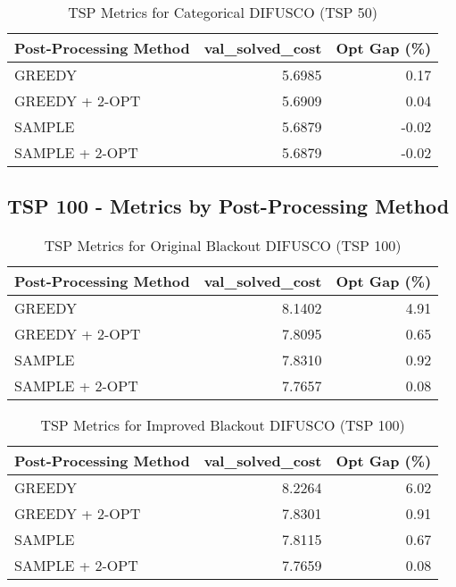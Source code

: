 \begin{table}[H]
    \centering
    \caption{TSP Metrics for Categorical DIFUSCO (TSP 50)}
    \begin{tabular}{lrr}
        \toprule
        Post-Processing Method & val\_solved\_cost & Opt Gap (\%) \\
        \midrule
        GREEDY                 & 5.6985 & 0.17 \\
        GREEDY + 2-OPT         & 5.6909 & 0.04 \\
        SAMPLE                 & 5.6879 & -0.02 \\
        SAMPLE + 2-OPT         & 5.6879 & -0.02 \\
        \bottomrule
    \end{tabular}
\end{table}

\clearpage
\subsection*{TSP 100 - Metrics by Post-Processing Method}

\begin{table}[H]
    \centering
    \caption{TSP Metrics for Original Blackout DIFUSCO (TSP 100)}
    \begin{tabular}{lrr}
        \toprule
        Post-Processing Method & val\_solved\_cost & Opt Gap (\%) \\
        \midrule
        GREEDY                 & 8.1402 & 4.91 \\
        GREEDY + 2-OPT         & 7.8095 & 0.65 \\
        SAMPLE                 & 7.8310 & 0.92 \\
        SAMPLE + 2-OPT         & 7.7657 & 0.08 \\
        \bottomrule
    \end{tabular}
\end{table}

\begin{table}[H]
    \centering
    \caption{TSP Metrics for Improved Blackout DIFUSCO (TSP 100)}
    \begin{tabular}{lrr}
        \toprule
        Post-Processing Method & val\_solved\_cost & Opt Gap (\%) \\
        \midrule
        GREEDY                 & 8.2264 & 6.02 \\
        GREEDY + 2-OPT         & 7.8301 & 0.91 \\
        SAMPLE                 & 7.8115 & 0.67 \\
        SAMPLE + 2-OPT         & 7.7659 & 0.08 \\
        \bottomrule
    \end{tabular}
\end{table}

